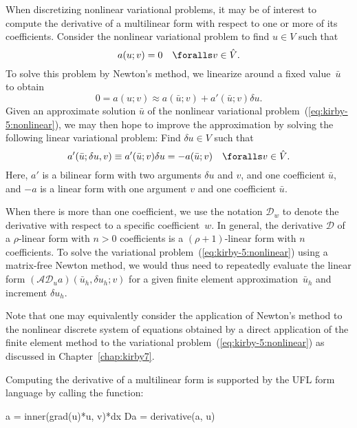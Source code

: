 When discretizing nonlinear variational problems, it may be of
interest to compute the derivative of a multilinear form with respect
to one or more of its coefficients. Consider the nonlinear variational
problem to find $u \in V$ such that
\begin{equation} \label{eq:kirby-5:nonlinear}
  a(u; v) = 0 \quad \foralls v \in \hat{V}.
\end{equation}
To solve this problem by Newton's method, we linearize around a fixed
value~$\bar{u}$ to obtain
\begin{equation}
  0 = a(u; v) \approx a(\bar{u}; v) + a'(\bar{u}; v) \delta u.
\end{equation}
Given an approximate solution $\bar{u}$ of the nonlinear variational
problem~(\ref{eq:kirby-5:nonlinear}), we may then hope to improve the
approximation by solving the following linear variational problem:
Find $\delta u \in V$ such that
\begin{equation}
  a'(\bar{u}; \delta u, v) \equiv a'(\bar{u}; v) \delta u = -a(\bar{u}; v)
  \quad \foralls v \in \hat{V}.
\end{equation}
Here, $a'$ is a bilinear form with two arguments $\delta u$ and $v$,
and one coefficient $\bar{u}$, and $-a$ is a linear form with one
argument $v$ and one coefficient $\bar{u}$.

When there is more than one coefficient, we use the notation
$\mathcal{D}_w$ to denote the derivative with respect to a specific
coefficient~$w$. In general, the derivative $\mathcal{D}$ of a
$\rho$-linear form with $n > 0$ coefficients is a $(\rho+1)$-linear
form with $n$ coefficients. To solve the variational
problem~(\ref{eq:kirby-5:nonlinear}) using a matrix-free Newton
method, we would thus need to repeatedly evaluate the linear form
$(\mathcal{A}\mathcal{D}_u a) (\bar{u}_h, \delta u_h; v)$ for a given
finite element approximation~$\bar{u}_h$ and increment $\delta u_h$.

Note that one may equivalently consider the application of Newton's
method to the nonlinear discrete system of equations obtained by a
direct application of the finite element method to the variational
problem~(\ref{eq:kirby-5:nonlinear}) as discussed in
Chapter~\ref{chap:kirby7}.

Computing the derivative of a multilinear form is supported by the UFL
form language by calling the  function:
\begin{python}
  a  = inner(grad(u)*u, v)*dx
  Da = derivative(a, u)
\end{python}

